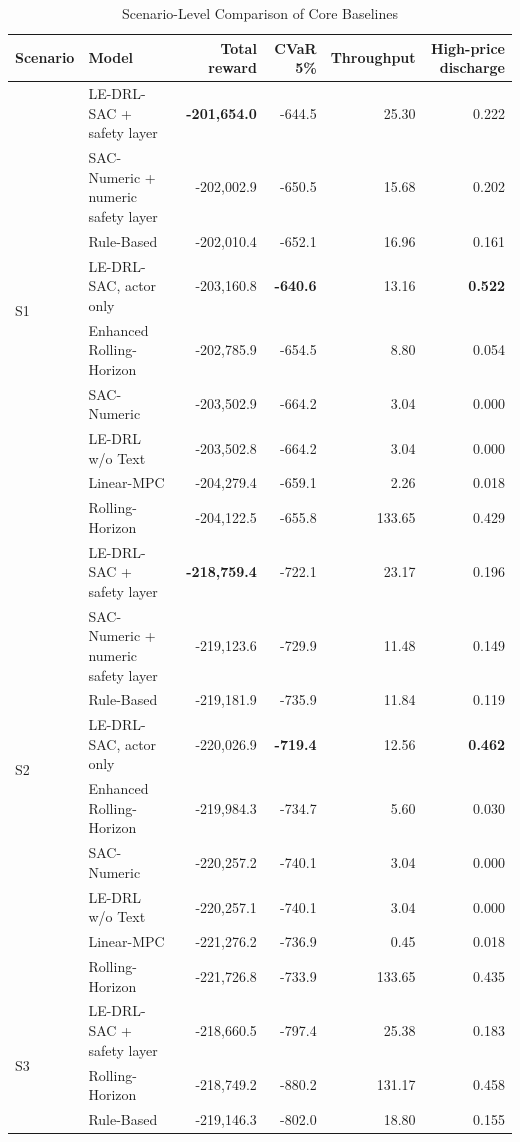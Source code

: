 \documentclass{ieeeaccess}
\begin{document}
\begin{table}[t!]
\caption{Scenario-Level Comparison of Core Baselines}
\label{tab:scenario_results}
\centering
\begin{tabular}{llrrrr}
\toprule
\textbf{Scenario} & \textbf{Model} & \textbf{Total reward} & \textbf{CVaR 5\%} & \textbf{Throughput} & \textbf{High-price discharge} \\
\midrule
\multirow{9}{*}{S1} & LE-DRL-SAC + safety layer & \textbf{-201,654.0} & -644.5 & 25.30 & 0.222 \\
& SAC-Numeric + numeric safety layer & -202,002.9 & -650.5 & 15.68 & 0.202 \\
& Rule-Based & -202,010.4 & -652.1 & 16.96 & 0.161 \\
& LE-DRL-SAC, actor only & -203,160.8 & \textbf{-640.6} & 13.16 & \textbf{0.522} \\
& Enhanced Rolling-Horizon & -202,785.9 & -654.5 & 8.80 & 0.054 \\
& SAC-Numeric & -203,502.9 & -664.2 & 3.04 & 0.000 \\
& LE-DRL w/o Text & -203,502.8 & -664.2 & 3.04 & 0.000 \\
& Linear-MPC & -204,279.4 & -659.1 & 2.26 & 0.018 \\
& Rolling-Horizon & -204,122.5 & -655.8 & 133.65 & 0.429 \\
\midrule
\multirow{9}{*}{S2} & LE-DRL-SAC + safety layer & \textbf{-218,759.4} & -722.1 & 23.17 & 0.196 \\
& SAC-Numeric + numeric safety layer & -219,123.6 & -729.9 & 11.48 & 0.149 \\
& Rule-Based & -219,181.9 & -735.9 & 11.84 & 0.119 \\
& LE-DRL-SAC, actor only & -220,026.9 & \textbf{-719.4} & 12.56 & \textbf{0.462} \\
& Enhanced Rolling-Horizon & -219,984.3 & -734.7 & 5.60 & 0.030 \\
& SAC-Numeric & -220,257.2 & -740.1 & 3.04 & 0.000 \\
& LE-DRL w/o Text & -220,257.1 & -740.1 & 3.04 & 0.000 \\
& Linear-MPC & -221,276.2 & -736.9 & 0.45 & 0.018 \\
& Rolling-Horizon & -221,726.8 & -733.9 & 133.65 & 0.435 \\
\midrule
\multirow{9}{*}{S3} & LE-DRL-SAC + safety layer & -218,660.5 & -797.4 & 25.38 & 0.183 \\
& Rolling-Horizon & -218,749.2 & -880.2 & 131.17 & 0.458 \\
& Rule-Based & -219,146.3 & -802.0 & 18.80 & 0.155 \\

\end{tabular}
\end{table}
\end{document}
